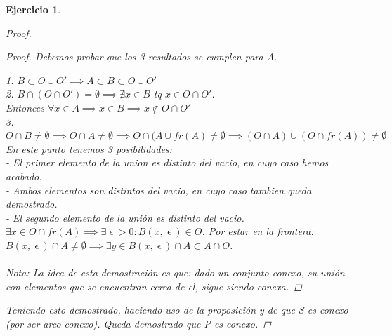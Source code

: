 \documentclass[11pt, a4paper, titlepage]{article}
\let\epsilon\upvarepsilon
\theoremstyle{exercise-style}
\newtheorem*{ejer}{Ejercicio}
\theoremstyle{theorem-style}
\begin{document}
\begin{ejer}
\begin{proof}
\begin{proof}
 Debemos probar que los 3 resultados se cumplen para A. 
 
 1. $B \subset O \cup O' \implies A \subset B \subset O \cup O'$\\
 2. $B \cap (O\cap O') = \emptyset \implies \nexists x \in B$ tq $x \in O \cap O'$. \\
 Entonces $\forall x \in A \implies x \in B \implies x \not\in O \cap O'$\\
 3. $O \cap B \neq \emptyset \implies O\cap \bar{A} \neq \emptyset \implies O\cap (A\cup fr(A) \neq \emptyset \implies (O\cap A)\cup (O\cap fr(A)) \neq \emptyset$
 En este punto tenemos 3 posibilidades:\\
  - El primer elemento de la union es distinto del vacio, en cuyo caso hemos acabado.\\
  - Ambos elementos son distintos del vacio, en cuyo caso tambien queda demostrado.\\
  - El segundo elemento de la unión es distinto del vacio. $\exists x \in O\cap fr(A) \implies \exists \epsilon > 0 : B(x,\epsilon) \in O$. Por estar en la frontera: $B(x,\epsilon)\cap A \neq \emptyset \implies \exists y \in B(x,\epsilon)\cap A \subset A \cap O$.\\\\
  
  Nota: La idea de esta demostración es que: dado un conjunto conexo, su unión con elementos que se encuentran cerca de el, sigue siendo conexa.
  
\end{proof}

Teniendo esto demostrado, haciendo uso de la proposición y de que S es conexo (por ser arco-conexo). Queda demostrado que P es conexo.

\end{proof}

\end{ejer}
\end{document}
